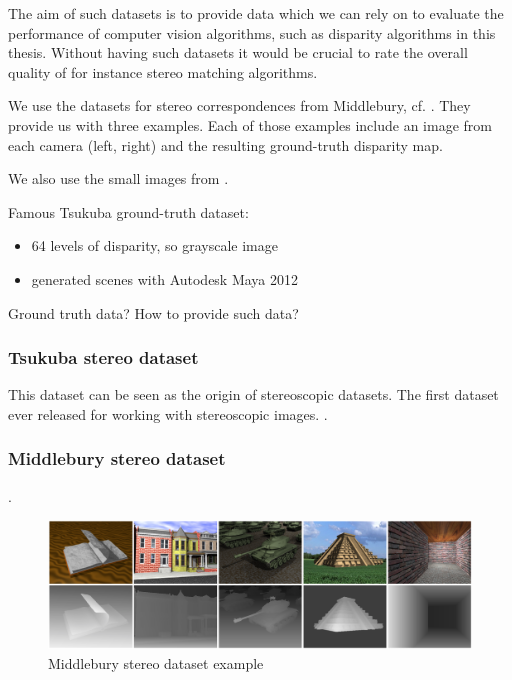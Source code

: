 The aim of such datasets is to provide data which we can rely on to evaluate the performance of computer vision algorithms, such as disparity algorithms in this thesis.
 Without having such datasets it would be crucial to rate the overall quality of for instance stereo matching algorithms.

We use the datasets for stereo correspondences from Middlebury, cf.  \citep{scharstein2014high}. They provide us with three examples. Each of those examples include an image from each camera (left, right) and the resulting ground-truth disparity map.

We also use the small images from \citep{martull2012realistic}.

Famous Tsukuba ground-truth dataset:

\begin{itemize}
  \item 64 levels of disparity, so grayscale image
  \item generated scenes with Autodesk Maya 2012
\end{itemize}

\citep{martull2012realistic}

Ground truth data? How to provide such data?


\subsubsection{Tsukuba stereo dataset}

This dataset can be seen as the origin of stereoscopic datasets.
The first dataset ever released for working with stereoscopic images.
\citep{martull2012realistic}.


\subsubsection{Middlebury stereo dataset}

\citep{scharstein2014high}.

\begin{figure}[h!]
  \centering
  \includegraphics[width=1.0\textwidth]{src/images/dbcgrid-dataset.png}
  \caption[Middlebury stereo dataset example]{Middlebury stereo dataset example}
  \label{fig:dbcgrid-dataset}
\end{figure}

